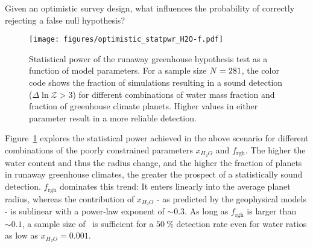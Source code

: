 \documentclass[twocolumn]{aastex631}
\begin{document}
\begin{note}
    Given an optimistic survey design, what influences the probability of correctly rejecting a false null hypothesis?
    \begin{figure}[ht!]
        \begin{centering}
            \texttt{[image: figures/optimistic\_statpwr\_H2O-f.pdf]}
            \caption{
                Statistical power of the runaway greenhouse hypothesis test as a function of model parameters.
                For a sample size $N = 281$, the color code shows the fraction of simulations resulting in a sound detection ($\Delta \ln \mathcal{Z} > 3$) for different combinations of water mass fraction and fraction of greenhouse climate planets.
                Higher values in either parameter result in a more reliable detection.
            }
            \label{fig:statpwr_H2O-f}
        \end{centering}
    \end{figure}
    Figure~\ref{fig:statpwr_H2O-f} explores the statistical power achieved in the above scenario for different combinations of the poorly constrained parameters $x_{H_2O}$ and $f_\mathrm{rgh}$.
    The higher the water content and thus the radius change, and the higher the fraction of planets in runaway greenhouse climates, the greater the prospect of a statistically sound detection.
     $f_\mathrm{rgh}$ dominates this trend: It enters linearly into the average planet radius, whereas the contribution of $x_{H_2O}$ - as predicted by the geophysical models - is sublinear with a power-law exponent of $\sim 0.3$.
    As long as $f_\mathrm{rgh}$ is larger than $\sim 0.1$, a sample size of \Nplanets\ is sufficient for a $\SI{50}{\percent}$ detection rate even for water ratios as low as $x_{H_2O} = 0.001$.
\end{note}
\end{document}
